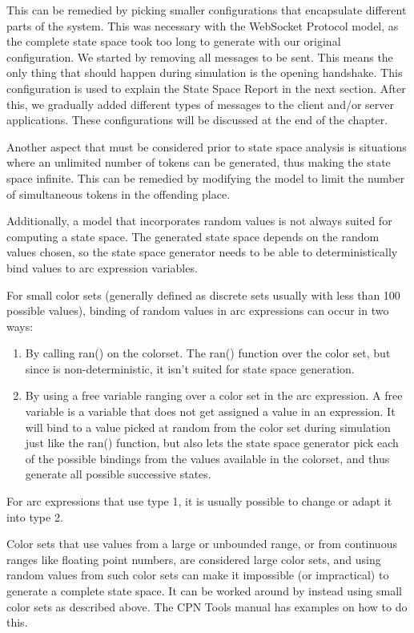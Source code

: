 		This can be remedied by picking smaller configurations that encapsulate
		different parts of the system. This was necessary with the WebSocket Protocol
		model, as the complete state space took too long to generate with our
		original configuration. 
		We started by removing all messages to be sent. This means the only thing that
		should happen during simulation is the opening handshake. This configuration
		is used to explain the State Space Report in the next section.
		After this, we gradually added different types of messages to the client
		and/or server applications. These configurations will be discussed at the end
		of the chapter.
		
		Another aspect that must be considered prior to state space analysis is
		situations where an unlimited number of tokens can be generated, thus making
		the state space infinite. This can be remedied by modifying the model to
		limit the number of simultaneous tokens in the offending place.
		
		Additionally, a model that incorporates random values is not always suited
		for computing a state space. The generated state space depends on the random
		values chosen, so the state space generator needs to be able to
		deterministically bind values to arc expression variables.
				
		For small color sets (generally defined as discrete sets usually with less
		than 100 possible values), binding of random values in arc expressions can
		occur in two ways: 
		\begin{enumerate}
		\item By calling ran() on the colorset. The ran() function  over the
		color set, but since is non-deterministic, it isn't suited for state space
		generation.
		\item By using a free variable ranging over a color set in the arc expression.
		A free variable is a variable that does not get assigned a value in an expression. It will 
		bind to a value picked at random from the color set during simulation just
		like the ran() function, but also lets the state space generator pick each of 
		the possible bindings from the values available in the colorset, and thus
		generate all possible successive states. 
		\end{enumerate}
		
		For arc expressions that use type 1, it is usually possible to change or
		adapt it into type 2.
		
		Color sets that use values from a large or unbounded range, or from continuous
		ranges like floating point numbers, are considered large color sets, and using
		random values from such color sets can make it impossible (or impractical)
		to generate a complete state space. It can be worked around by
		instead using small color sets as described above. The CPN Tools manual has
		examples on how to do this.
		
